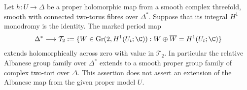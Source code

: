 
\begin{proposition}\label{cdp:st:D.2.6}

Let $h:U\to\Delta$ be a proper holomorphic map from a smooth
complex threefold, smooth with connected two-torus fibres over
$\Delta^*$. Suppose that its integral $H^1$ monodromy is the
identity. The marked period map
\[
 \Delta^*\longrightarrow
 \mathcal T_2
 :=\{W\in\operatorname{Gr}(2,H^1(U_t;\C)):
                   W\oplus\overline W=H^1(U_t;\C)\}
\]
extends holomorphically across zero with value in $\mathcal T_2$.
In particular the relative Albanese group family over $\Delta^*$
extends to a smooth proper group family of complex two-tori over
$\Delta$. This assertion does not assert an extension of the
Albanese map from the given proper model $U$.
\end{proposition}
